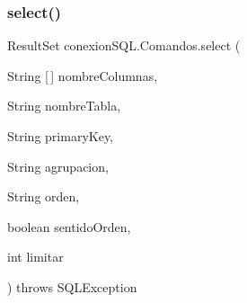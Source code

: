 \subsubsection{\texorpdfstring{select()}{select()}}
{\footnotesize\ttfamily Result\+Set conexion\+S\+Q\+L.\+Comandos.\+select (\begin{DoxyParamCaption}\item[{String \mbox{[}$\,$\mbox{]}}]{nombre\+Columnas,  }\item[{String}]{nombre\+Tabla,  }\item[{String}]{primary\+Key,  }\item[{String}]{agrupacion,  }\item[{String}]{orden,  }\item[{boolean}]{sentido\+Orden,  }\item[{int}]{limitar }\end{DoxyParamCaption}) throws S\+Q\+L\+Exception}

